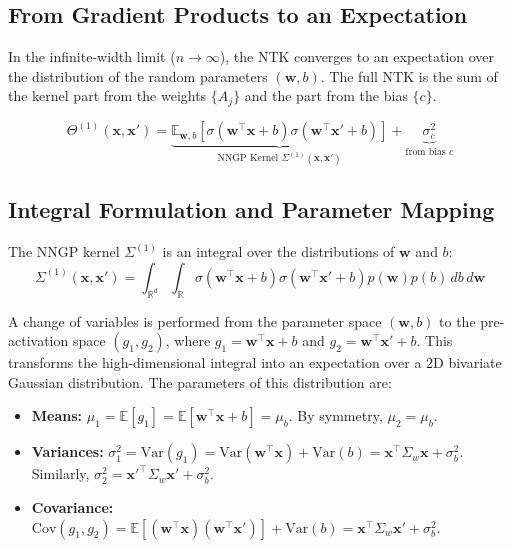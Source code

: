 \documentclass[a4paper]{article}
\theoremstyle{plain}
\theoremstyle{definition}
\theoremstyle{remark}
\begin{document}
\subsection{From Gradient Products to an Expectation}
In the infinite-width limit ($n \to \infty$), the NTK converges to an expectation over the distribution of the random parameters $(\bm{w}, b)$. The full NTK is the sum of the kernel part from the weights $\{A_j\}$ and the part from the bias $\{c\}$.

\begin{tcolorbox}[colback=blue!10,colframe=blue!80!black,title={\textbf{NTK as Expectation}},enhanced,drop shadow,boxrule=2pt]
\begin{equation}
\label{eq:ntk_expectation}
    \boxed{\Theta^{(1)}(\bm{x}, \bm{x}') = \underbrace{\mathbb{E}_{\bm{w},b} \left[ \sigma(\bm{w}^\top \bm{x} + b)\sigma(\bm{w}^\top \bm{x}' + b) \right]}_{\text{NNGP Kernel } \Sigma^{(1)}(\bm{x}, \bm{x}')} + \underbrace{\sigma_c^2}_{\text{from bias } c}}
\end{equation}
\end{tcolorbox}

\subsection{Integral Formulation and Parameter Mapping}
The NNGP kernel $\Sigma^{(1)}$ is an integral over the distributions of $\bm{w}$ and $b$:
\begin{equation}
    \Sigma^{(1)}(\bm{x}, \bm{x}') = \int_{\mathbb{R}^d} \int_{\mathbb{R}} \sigma(\bm{w}^\top \bm{x} + b)\sigma(\bm{w}^\top \bm{x}' + b) p(\bm{w})p(b) \,db \,d\bm{w}
\end{equation}

A change of variables is performed from the parameter space $(\bm{w}, b)$ to the pre-activation space $(g_1, g_2)$, where $g_1 = \bm{w}^\top \bm{x} + b$ and $g_2 = \bm{w}^\top \bm{x}' + b$. This transforms the high-dimensional integral into an expectation over a 2D bivariate Gaussian distribution. The parameters of this distribution are:

\begin{tcolorbox}[colback=green!5,colframe=green!80!black,title={\textbf{Remark: Bivariate Gaussian Parameters}},enhanced,drop shadow,boxrule=2pt]
\begin{itemize}
    \item \textbf{Means:} $\mu_1 = \mathbb{E}[g_1] = \mathbb{E}[\bm{w}^\top\bm{x} + b] = \mu_b$. By symmetry, $\mu_2 = \mu_b$.
    \item \textbf{Variances:} $\sigma_1^2 = \text{Var}(g_1) = \text{Var}(\bm{w}^\top\bm{x}) + \text{Var}(b) = \bm{x}^\top \Sigma_w \bm{x} + \sigma_b^2$. Similarly, $\sigma_2^2 = {\bm{x}'}^\top \Sigma_w \bm{x}' + \sigma_b^2$.
    \item \textbf{Covariance:} $\text{Cov}(g_1, g_2) = \mathbb{E}[(\bm{w}^\top\bm{x})(\bm{w}^\top\bm{x}')] + \text{Var}(b) = \bm{x}^\top \Sigma_w \bm{x}' + \sigma_b^2$.
\end{itemize}
\end{tcolorbox}
\end{document}
